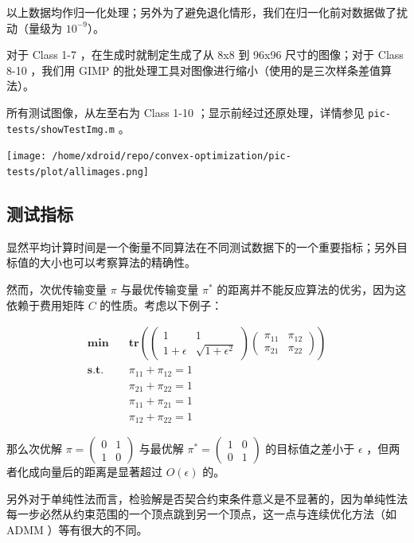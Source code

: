 \documentclass[]{article}
\begin{document}
以上数据均作归一化处理；另外为了避免退化情形，我们在归一化前对数据做了扰动（量级为
\(10^{-9}\)）。

对于 Class 1-7 ，在生成时就制定生成了从 8x8 到 96x96 尺寸的图像；对于
Class 8-10 ，我们用 GIMP
的批处理工具对图像进行缩小（使用的是三次样条差值算法）。

所有测试图像，从左至右为 Class 1-10 ；显示前经过还原处理，详情参见
\texttt{pic-tests/showTestImg.m} 。

\texttt{[image: /home/xdroid/repo/convex-optimization/pic-tests/plot/allimages.png]}

\subsection{测试指标}

显然平均计算时间是一个衡量不同算法在不同测试数据下的一个重要指标；另外目标值的大小也可以考察算法的精确性。

然而，次优传输变量 \(\pi\) 与最优传输变量 \(\pi^*\)
的距离并不能反应算法的优劣，因为这依赖于费用矩阵 \(C\)
的性质。考虑以下例子：

\begin{align*}
\textbf{min} \quad & \textbf{tr}\left( \begin{pmatrix} 1 & 1 \\ 1+\epsilon & \sqrt{1+\epsilon^2} \end{pmatrix} \begin{pmatrix} \pi_{11} & \pi_{12} \\ \pi_{21} & \pi_{22} \end{pmatrix} \right) \\
\textbf{s.t.} \quad & \pi_{11} + \pi_{12} = 1 \\
& \pi_{21} + \pi_{22} = 1 \\
& \pi_{11} + \pi_{21} = 1 \\
& \pi_{12} + \pi_{22} = 1
\end{align*}

那么次优解 \(\pi=\begin{pmatrix} 0 & 1 \\ 1 & 0 \end{pmatrix}\) 与最优解
\(\pi^*=\begin{pmatrix} 1 & 0 \\ 0 & 1 \end{pmatrix}\) 的目标值之差小于
\(\epsilon\) ，但两者化成向量后的距离是显著超过 \(O(\epsilon)\) 的。

另外对于单纯性法而言，检验解是否契合约束条件意义是不显著的，因为单纯性法每一步必然从约束范围的一个顶点跳到另一个顶点，这一点与连续优化方法（如
ADMM ）等有很大的不同。
\end{document}
